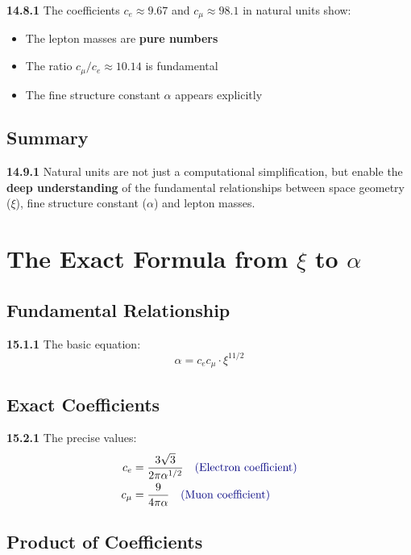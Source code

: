 \documentclass[12pt,a4paper]{article}
\begin{document}
\noindent \textbf{14.8.1} The coefficients $c_e \approx 9.67$ and $c_\mu \approx 98.1$ in natural units show:

\begin{itemize}
	\item The lepton masses are \textbf{pure numbers}
	\item The ratio $c_\mu/c_e \approx 10.14$ is fundamental
	\item The fine structure constant $\alpha$ appears explicitly
\end{itemize}

\subsection{Summary}

\noindent \textbf{14.9.1} Natural units are not just a computational simplification, but enable the \textbf{deep understanding} of the fundamental relationships between space geometry ($\xi$), fine structure constant ($\alpha$) and lepton masses.


\section{The Exact Formula from $\xi$ to $\alpha$}

\subsection{Fundamental Relationship}

\noindent \textbf{15.1.1} The basic equation:
\[
\boxed{\alpha = c_e c_\mu \cdot \xi^{11/2}}
\]

\subsection{Exact Coefficients}

\noindent \textbf{15.2.1} The precise values:
\begin{align*}
	c_e &= \frac{3\sqrt{3}}{2\pi\alpha^{1/2}} \quad \textcolor{deepblue}{\text{(Electron coefficient)}} \\
	c_\mu &= \frac{9}{4\pi\alpha} \quad \textcolor{deepblue}{\text{(Muon coefficient)}}
\end{align*}

\subsection{Product of Coefficients}
\end{document}
